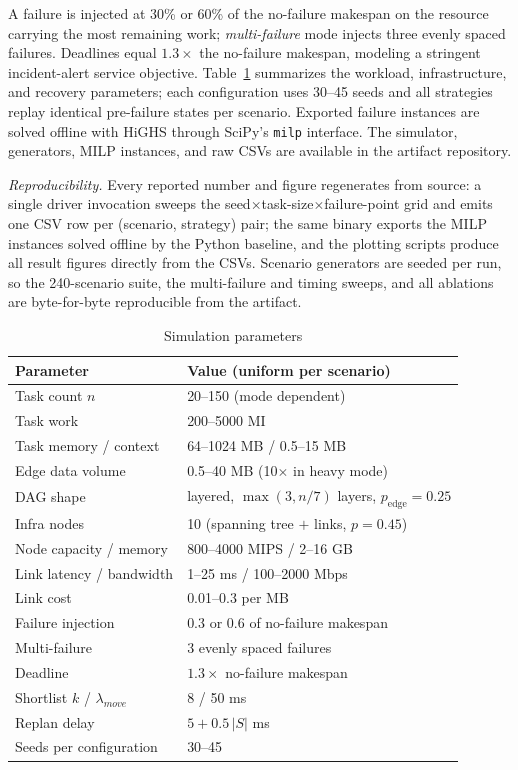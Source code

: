 \documentclass[conference]{IEEEtran}
\theoremstyle{remark}
\begin{document}
A failure is injected at 30\% or 60\% of the no-failure makespan on the
resource carrying the most remaining work; \emph{multi-failure} mode
injects three evenly spaced failures. Deadlines equal $1.3\times$ the
no-failure makespan, modeling a stringent incident-alert service
objective. Table~\ref{tab:params} summarizes the workload,
infrastructure, and recovery parameters; each configuration uses 30--45
seeds and all strategies replay identical pre-failure states per scenario.
Exported failure instances are solved offline with HiGHS through SciPy's
\texttt{milp} interface. The simulator, generators, MILP instances, and
raw CSVs are available in the artifact repository.

\emph{Reproducibility.} Every reported number and figure regenerates from
source: a single driver invocation sweeps the
seed$\times$task-size$\times$failure-point grid and emits one CSV row per
(scenario, strategy) pair; the same binary exports the MILP instances
solved offline by the Python baseline, and the plotting scripts produce
all result figures directly from the CSVs. Scenario generators are seeded
per run, so the 240-scenario suite, the multi-failure and timing sweeps,
and all ablations are byte-for-byte reproducible from the artifact.

\begin{table}[t]
\centering
\caption{Simulation parameters}
\label{tab:params}
\small
\setlength{\tabcolsep}{5pt}
\begin{tabular}{@{}ll@{}}
\toprule
Parameter & Value (uniform per scenario) \\
\midrule
Task count $n$ & 20--150 (mode dependent) \\
Task work & 200--5000 MI \\
Task memory / context & 64--1024 MB / 0.5--15 MB \\
Edge data volume & 0.5--40 MB (10$\times$ in heavy mode) \\
DAG shape & layered, $\max(3,n/7)$ layers, $p_{\mathrm{edge}}{=}0.25$ \\
\midrule
Infra nodes & 10 (spanning tree $+$ links, $p{=}0.45$) \\
Node capacity / memory & 800--4000 MIPS / 2--16 GB \\
Link latency / bandwidth & 1--25 ms / 100--2000 Mbps \\
Link cost & 0.01--0.3 per MB \\
\midrule
Failure injection & 0.3 or 0.6 of no-failure makespan \\
Multi-failure & 3 evenly spaced failures \\
Deadline & $1.3\times$ no-failure makespan \\
Shortlist $k$ / $\lambda_{move}$ & 8 / 50 ms \\
Replan delay & $5 + 0.5\,|S|$ ms \\
Seeds per configuration & 30--45 \\
\bottomrule
\end{tabular}
\end{table}
\end{document}
